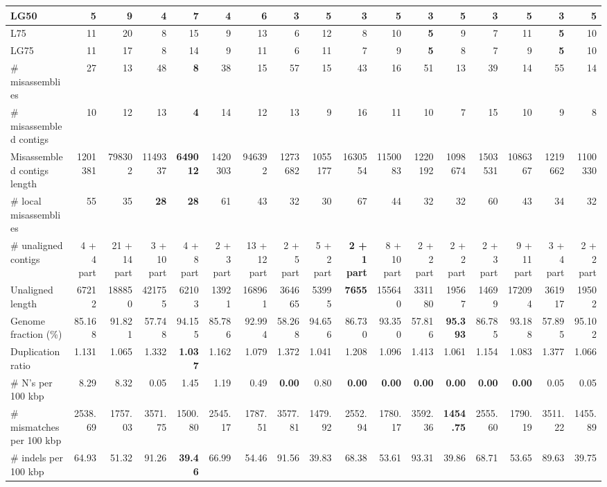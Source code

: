 \documentclass[12pt,a4paper]{article}
\begin{document}
\begin{table}[ht]
\begin{center}
\begin{tabular}{|l*{16}{|r}|}
LG50 & 5 & 9 & 4 & 7 & 4 & 6 & {\bf 3} & 5 & {\bf 3} & 5 & {\bf 3} & 5 & {\bf 3} & 5 & {\bf 3} & 5 \\ \hline
L75 & 11 & 20 & 8 & 15 & 9 & 13 & 6 & 12 & 8 & 10 & {\bf 5} & 9 & 7 & 11 & {\bf 5} & 10 \\ \hline
LG75 & 11 & 17 & 8 & 14 & 9 & 11 & 6 & 11 & 7 & 9 & {\bf 5} & 8 & 7 & 9 & {\bf 5} & 10 \\ \hline
\# misassemblies & 27 & 13 & 48 & {\bf 8} & 38 & 15 & 57 & 15 & 43 & 16 & 51 & 13 & 39 & 14 & 55 & 14 \\ \hline
\# misassembled contigs & 10 & 12 & 13 & {\bf 4} & 14 & 12 & 13 & 9 & 16 & 11 & 10 & 7 & 15 & 10 & 9 & 8 \\ \hline
Misassembled contigs length & 1201381 & 798302 & 1149337 & {\bf 649012} & 1420303 & 946392 & 1273682 & 1055177 & 1630554 & 1150083 & 1220192 & 1098674 & 1503531 & 1086367 & 1219662 & 1100330 \\ \hline
\# local misassemblies & 55 & 35 & {\bf 28} & {\bf 28} & 61 & 43 & 32 & 30 & 67 & 44 & 32 & 32 & 60 & 43 & 34 & 32 \\ \hline
\# unaligned contigs & 4 + 4 part & 21 + 14 part & 3 + 10 part & 4 + 8 part & 2 + 3 part & 13 + 12 part & 2 + 5 part & 5 + 2 part & {\bf 2 + 1 part} & 8 + 10 part & 2 + 2 part & 2 + 2 part & 2 + 3 part & 9 + 11 part & 3 + 4 part & 2 + 2 part \\ \hline
Unaligned length & 67212 & 188850 & 421755 & 62103 & 13921 & 168961 & 364665 & 53995 & {\bf 7655} & 155640 & 331180 & 19567 & 14699 & 172094 & 361917 & 19502 \\ \hline
Genome fraction (\%) & 85.168 & 91.821 & 57.748 & 94.155 & 85.786 & 92.994 & 58.268 & 94.656 & 86.730 & 93.350 & 57.816 & {\bf 95.393} & 86.785 & 93.188 & 57.895 & 95.102 \\ \hline
Duplication ratio & 1.131 & 1.065 & 1.332 & {\bf 1.037} & 1.162 & 1.079 & 1.372 & 1.041 & 1.208 & 1.096 & 1.413 & 1.061 & 1.154 & 1.083 & 1.377 & 1.066 \\ \hline
\# N's per 100 kbp & 8.29 & 8.32 & 0.05 & 1.45 & 1.19 & 0.49 & {\bf 0.00} & 0.80 & {\bf 0.00} & {\bf 0.00} & {\bf 0.00} & {\bf 0.00} & {\bf 0.00} & {\bf 0.00} & 0.05 & 0.05 \\ \hline
\# mismatches per 100 kbp & 2538.69 & 1757.03 & 3571.75 & 1500.80 & 2545.17 & 1787.51 & 3577.81 & 1479.92 & 2552.94 & 1780.17 & 3592.36 & {\bf 1454.75} & 2555.60 & 1790.19 & 3511.22 & 1455.89 \\ \hline
\# indels per 100 kbp & 64.93 & 51.32 & 91.26 & {\bf 39.46} & 66.99 & 54.46 & 91.56 & 39.83 & 68.38 & 53.61 & 93.31 & 39.86 & 68.71 & 53.65 & 89.63 & 39.75 \\ \hline

\end{tabular}
\end{center}
\end{table}
\end{document}
